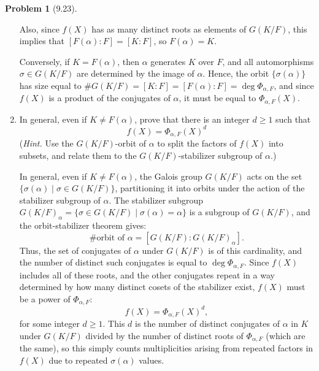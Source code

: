 \documentclass[12pt]{article}
\theoremstyle{definition}
\newtheorem{problem}{Problem}
\begin{document}
\begin{problem}[9.23]
\begin{enumerate}[label=(\alph*)]
\begin{solution}
            Also, since $f(X)$ has as many distinct roots as elements of $G(K/F)$, this implies that $[F(\alpha):F] = [K:F]$, so $F(\alpha) = K$.
            
            Conversely, if $K = F(\alpha)$, then $\alpha$ generates $K$ over $F$, and all automorphisms $\sigma \in G(K/F)$ are determined by the image of $\alpha$. Hence, the orbit $\{\sigma(\alpha)\}$ has size equal to $\#G(K/F) = [K:F] = [F(\alpha):F] = \deg \Phi_{\alpha, F}$, and since $f(X)$ is a product of the conjugates of $\alpha$, it must be equal to $\Phi_{\alpha, F}(X)$.            
        \end{solution}

        \item In general, even if $K \neq F(\alpha)$, prove that there is an integer $d \geq 1$ such that
              \[
                f(X) = \Phi_{\alpha, F}(X)^d
              \]
              (\textit{Hint.} Use the $G(K/F)$-orbit of $\alpha$ to split the factors of $f(X)$ into subsets,
              and relate them to the $G(K/F)$-stabilizer subgroup of $\alpha$.)
        
              \begin{solution}
            In general, even if $K \neq F(\alpha)$, the Galois group $G(K/F)$ acts on the set $\{\sigma(\alpha) \mid \sigma \in G(K/F)\}$, partitioning it into orbits under the action of the stabilizer subgroup of $\alpha$. The stabilizer subgroup $G(K/F)_\alpha = \{\sigma \in G(K/F) \mid \sigma(\alpha) = \alpha\}$ is a subgroup of $G(K/F)$, and the orbit-stabilizer theorem gives:
            \[
            \#\text{orbit of } \alpha = [G(K/F) : G(K/F)_\alpha].
            \]
            Thus, the set of conjugates of $\alpha$ under $G(K/F)$ is of this cardinality, and the number of distinct such conjugates is equal to $\deg \Phi_{\alpha, F}$. Since $f(X)$ includes all of these roots, and the other conjugates repeat in a way determined by how many distinct cosets of the stabilizer exist, $f(X)$ must be a power of $\Phi_{\alpha, F}$:
            \[
            f(X) = \Phi_{\alpha, F}(X)^d,
            \]
            for some integer $d \geq 1$. This $d$ is the number of distinct conjugates of $\alpha$ in $K$ under $G(K/F)$ divided by the number of distinct roots of $\Phi_{\alpha, F}$ (which are the same), so this simply counts multiplicities arising from repeated factors in $f(X)$ due to repeated $\sigma(\alpha)$ values.

        \end{solution}
    \end{enumerate}
\end{problem}
\end{document}

